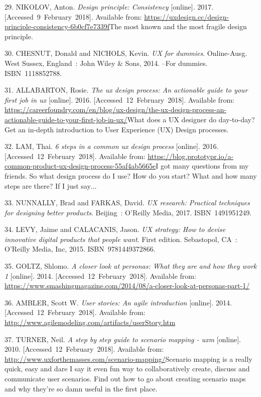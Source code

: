 \documentclass[american,a4paper,oneside,,tablecaptionabove]{scrbook}
\begin{document}
\hypertarget{ref-Nikolov.2017}{}
29. NIKOLOV, Anton. \emph{Design principle: Consistency} {[}online{]}.
2017. {[}Accessed~9~February~2018{]}. Available from:
\url{https://uxdesign.cc/design-principle-consistency-6b0cf7e7339f}The
most known and the most fragile design principle.

\hypertarget{ref-Chesnut.2014}{}
30. CHESNUT, Donald and NICHOLS, Kevin. \emph{UX for dummies}.
Online-Ausg. West Sussex, England~: John Wiley \& Sons, 2014. --For
dummies. ISBN~1118852788.

\hypertarget{ref-Allabarton.2016}{}
31. ALLABARTON, Rosie. \emph{The ux design process: An actionable guide
to your first job in ux} {[}online{]}. 2016.
{[}Accessed~12~February~2018{]}. Available from:
\url{https://careerfoundry.com/en/blog/ux-design/the-ux-design-process-an-actionable-guide-to-your-first-job-in-ux/}What
does a UX designer do day-to-day? Get an in-depth introduction to User
Experience (UX) Design processes.

\hypertarget{ref-Lam.2016}{}
32. LAM, Thai. \emph{6 steps in a common ux design process}
{[}online{]}. 2016. {[}Accessed~12~February~2018{]}. Available from:
\url{https://blog.prototypr.io/a-common-product-ux-design-process-55af4ab5665e}I
got many questions from my friends. So what design process do I use? How
do you start? What and how many steps are there? If I just say\(\ldots\)

\hypertarget{ref-Nunnally.2017}{}
33. NUNNALLY, Brad and FARKAS, David. \emph{UX research: Practical
techniques for designing better products}. Beijing~: O'Reilly Media,
2017. ISBN~1491951249.

\hypertarget{ref-Levy.2015}{}
34. LEVY, Jaime and CALACANIS, Jason. \emph{UX strategy: How to devise
innovative digital products that people want}. First edition.
Sebastopol, CA~: O'Reilly Media, Inc, 2015. ISBN~9781449372866.

\hypertarget{ref-Goltz.2014}{}
35. GOLTZ, Shlomo. \emph{A closer look at personas: What they are and
how they work \textbar{} 1} {[}online{]}. 2014.
{[}Accessed~12~February~2018{]}. Available from:
\url{https://www.smashingmagazine.com/2014/08/a-closer-look-at-personas-part-1/}

\hypertarget{ref-Ambler.2014}{}
36. AMBLER, Scott W. \emph{User stories: An agile introduction}
{[}online{]}. 2014. {[}Accessed~12~February~2018{]}. Available from:
\url{http://www.agilemodeling.com/artifacts/userStory.htm}

\hypertarget{ref-Turner.2010}{}
37. TURNER, Neil. \emph{A step by step guide to scenario mapping - uxm}
{[}online{]}. 2010. {[}Accessed~12~February~2018{]}. Available from:
\url{http://www.uxforthemasses.com/scenario-mapping/}Scenario mapping is
a really quick, easy and dare I say it even fun way to collaboratively
create, discuss and communicate user scenarios. Find out how to go about
creating scenario maps and why they're so damn useful in the first
place.
\end{document}
